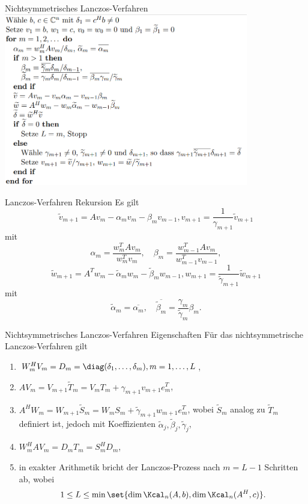 \begin{karte}{Nichtsymmetrisches Lanczos-Verfahren}
    \includegraphics[width=0.8\textwidth]{Nichtsymmetrisches-Lanczos-Verfahren.png}
\end{karte}

\begin{karte}{Lanczos-Verfahren Rekursion}
    Es gilt 
    \[ \tilde{v}_{m+1} = A v_m - \alpha_m v_m - \beta_m v_{m-1}, v_{m+1} = \frac{1}{\gamma_{m+1}} \tilde{v}_{m+1} \]
    mit 
    \[ \alpha_m = \frac{w_m^T A v_m}{w_m^T v_m}, \quad \beta_m = \frac{w_{m-1}^T A v_m}{w_{m-1}^T v_{m-1}}, \]
    \[ \tilde{w}_{m+1} = A^T w_m - \tilde{\alpha}_m w_m - \tilde{\beta}_m w_{m-1}, w_{m+1} = \frac{1}{\tilde{\gamma}_{m+1}} \tilde{w}_{m+1} \]
    mit 
    \[ \tilde{\alpha}_m = \overline{\alpha_m}, \quad \overline{\tilde{\beta}_m} = \frac{\gamma_m}{\tilde{\gamma}_m} \beta_m. \]
\end{karte}

\begin{karte}{Nichtsymmetrisches Lanczos-Verfahren Eigenschaften}
    Für das nichtsymmetrische Lanczos-Verfahren gilt 
    \begin{enumerate}
        \item \( W_m^H V_m = D_m = \diag(\delta_1, \ldots, \delta_m), m = 1,\ldots, L \),
        \item \( A V_m = V_{m+1} \tilde{T}_m = V_m T_m + \gamma_{m+1} v_{m+1} e_m^T \),
        \item \( A^H W_m = W_{m+1} \tilde{S}_m = W_m S_m + \tilde{\gamma}_{m+1} w_{m+1} e_m^T \), 
        wobei \(\tilde{S}_m\) analog zu \(\tilde{T}_m\) definiert ist, jedoch mit Koeffizienten 
        \( \tilde{\alpha}_j, \tilde{\beta}_j, \tilde{\gamma}_j \), 
        \item \( W_m^H A V_m = D_m T_m = S_m^H D_m \),
        \item in exakter Arithmetik bricht der Lanczos-Prozess nach \(m= L-1\) 
        Schritten ab, wobei 
        \[ 1 \leq L \leq \min\set{ \dim \Kcal_n(A,b), \dim \Kcal_n(A^H, c) }. \]
    \end{enumerate}
\end{karte}

